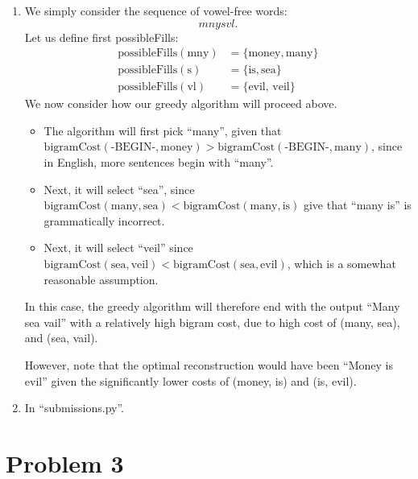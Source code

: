 \documentclass[12pt]{article}
\begin{document}
\begin{enumerate}[label=(\alph*)]
  \item We simply consider the sequence of vowel-free words:
  $$
    mny s vl.
  $$
  Let us define first possibleFills:
  \begin{align*}
    \text{possibleFills}(\text{mny}) &= \{ \text{money}, \text{many} \} \\
    \text{possibleFills}(\text{s}) &= \{\text{is}, \text{sea} \} \\
    \text{possibleFills}(\text{vl}) &=  \{ \text{evil, veil} \}
  \end{align*}
  We now consider how our greedy algorithm will proceed above.

  \begin{itemize}
    \item The algorithm will first pick ``many'', given that $\text{bigramCost}(\text{-BEGIN-}, \text{money}) > \text{bigramCost}(\text{-BEGIN-}, \text{many})$, since in English, more sentences begin with ``many''.
    \item Next, it will select ``sea'', since $\text{bigramCost}(\text{many}, \text{sea}) < \text{bigramCost}(\text{many}, \text{is})$ give that ``many is'' is grammatically incorrect. 
    \item Next, it will select ``veil'' since $\text{bigramCost}(\text{sea}, \text{veil}) < \text{bigramCost}(\text{sea}, \text{evil})$, which is a somewhat reasonable assumption.
  \end{itemize}
  In this case, the greedy algorithm will therefore end with the output ``Many sea vail'' with a relatively high bigram cost, due to high cost of (many, sea), and (sea, vail).

  However, note that the optimal reconstruction would have been ``Money is evil'' given the significantly lower costs of (money, is) and (is, evil).
  \item In ``submissions.py''.
\end{enumerate}

\section*{Problem 3}
\end{document}
